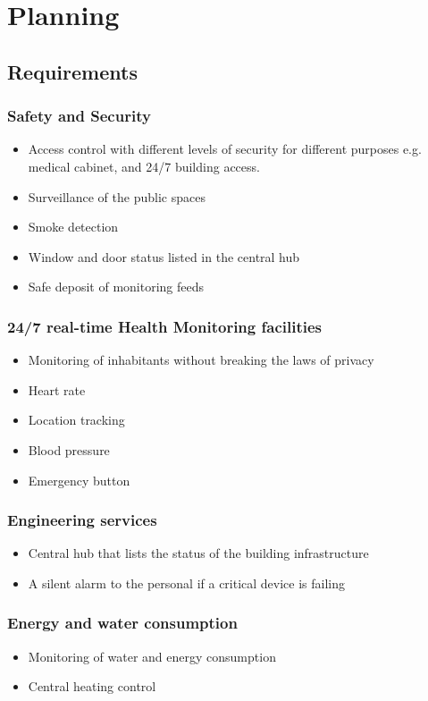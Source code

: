 
\chapter{Planning}
\label{sec:org2610146}
\section{Requirements}
\label{sec:org945b9f4}
\subsection{Safety and Security}
\label{sec:org34def69}
\begin{itemize}
\item Access control with different levels of security for different purposes e.g. medical cabinet, and 24/7 building access.
\item Surveillance of the public spaces
\item Smoke detection
\item Window and door status listed in the central hub
\item Safe deposit of monitoring feeds
\end{itemize}
\subsection{24/7 real-time Health Monitoring facilities}
\label{sec:orge43b7b8}
\begin{itemize}
\item Monitoring of inhabitants without breaking the laws of privacy
\item Heart rate
\item Location tracking
\item Blood pressure
\item Emergency button
\end{itemize}
\subsection{Engineering services}
\label{sec:org3b95898}
\begin{itemize}
\item Central hub that lists the status of the building infrastructure 
\item A silent alarm to the personal if a critical device is failing
\end{itemize}
\subsection{Energy and water consumption}
\label{sec:orgd85891f}
\begin{itemize}
\item Monitoring of water and energy consumption
\item Central heating control
\end{itemize}
